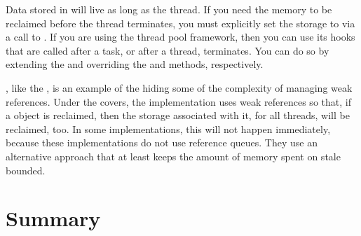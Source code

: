 Data stored in \tls will live as long as the thread. If you need
the memory to be reclaimed before the thread terminates, you must explicitly set
the storage to  via a call to . If you are using
the  thread pool framework, then you can use its
hooks that are called after a task, or after a thread, terminates. You can do so
by extending the  and overriding the
 and  methods, respectively.

\Tls, like the , is an example of the \jre hiding some of the
complexity of managing weak references. Under the covers, the \tls implementation
uses weak references so that, if a  object is reclaimed, then
the storage associated with it, for all threads, will be reclaimed, too. In some
implementations, this will not happen immediately, because these implementations
do not use reference queues. They use an alternative approach that at least
keeps the amount of memory spent on stale \tls bounded.

\section{Summary}






